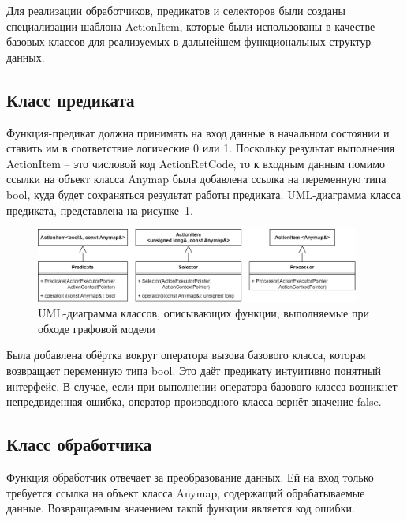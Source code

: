 Для реализации обработчиков, предикатов и селекторов были созданы специализации шаблона \textsf{ActionItem}, которые были использованы в качестве базовых классов для реализуемых в дальнейшем функциональных структур данных.

\subsection{Класс предиката}
Функция-предикат должна принимать на вход данные в начальном состоянии и ставить им в соответствие логические 0 или 1. Поскольку результат выполнения \textsf{ActionItem} -- это числовой код \textsf{ActionRetCode}, то к входным данным помимо ссылки на объект класса Anymap была добавлена ссылка на переменную типа bool, куда будет сохраняться результат работы предиката. UML-диаграмма класса предиката, представлена на рисунке~\ref{fig:UMLPredicate}.
\begin{figure}[!ht]
    \centering
    \includegraphics[width=0.95\textwidth]{figures/UML.graphFunctions.png}
    \caption{UML-диаграмма классов, описывающих функции, выполняемые при обходе графовой модели}
    \label{fig:UMLPredicate}
\end{figure}

Была добавлена обёртка вокруг оператора вызова базового класса, которая возвращает переменную типа bool. Это даёт предикату интуитивно понятный интерфейс. В случае, если при выполнении оператора базового класса возникнет непредвиденная ошибка, оператор производного класса вернёт значение \textsf{false}.

\subsection{Класс обработчика}
Функция обработчик отвечает за преобразование данных. Ей на вход только требуется ссылка на объект класса Anymap, содержащий обрабатываемые данные. Возвращаемым значением такой функции является код ошибки.
